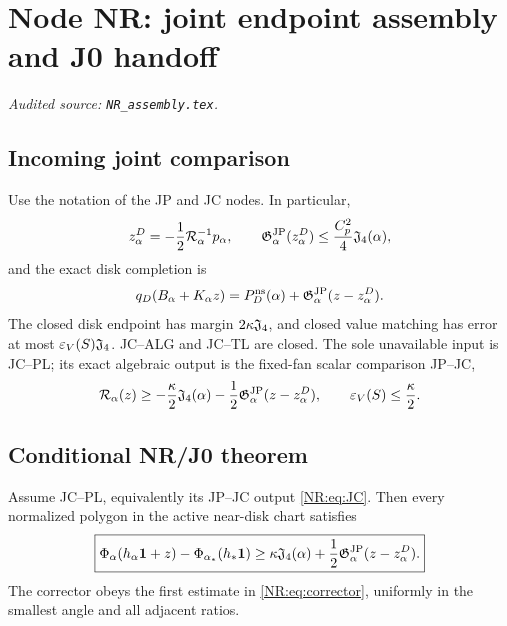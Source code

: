 \begingroup
\section{Node NR: joint endpoint assembly and J0 handoff}
\label{module:NR}
\noindent\textit{Audited source: \nolinkurl{NR_assembly.tex}.}
\subsection{Incoming joint comparison}

Use the notation of the JP and JC nodes.  In particular,
\begin{equation}\label{NR:eq:corrector}
 z_\alpha^D=-\frac12\mathcal R_\alpha^{-1}p_\alpha,
 \qquad
 \mathfrak G^{\rm JP}_\alpha(z_\alpha^D)
 \le\frac{C_p^2}{4}\mathfrak J_4(\alpha),
\end{equation}
and the exact disk completion is
\begin{equation}\label{NR:eq:disk-completion}
 q_D(B_\alpha+K_\alpha z)
 =P_D^{\rm ns}(\alpha)+\mathfrak G^{\rm JP}_\alpha(z-z_\alpha^D).
\end{equation}
The closed disk endpoint has margin $2\kappa\mathfrak J_4$, and closed value
matching has error at most $\varepsilon_V(S)\mathfrak J_4$.  JC--ALG and JC--TL
are closed.  The sole unavailable input is JC--PL; its exact algebraic
output is the fixed-fan scalar comparison JP--JC,
\begin{equation}\label{NR:eq:JC}
 \mathcal{R}_\alpha(z)
 \ge-\frac\kappa2\mathfrak J_4(\alpha)
      -\frac12\mathfrak G^{\rm JP}_\alpha(z-z_\alpha^D),
 \qquad \varepsilon_V(S)\le\frac\kappa2.
\end{equation}

\subsection{Conditional NR/J0 theorem}

\begin{theorem}[JP--JC implies J0]\label{NR:thm:NR}
Assume JC--PL, equivalently its JP--JC output \eqref{NR:eq:JC}.  Then every normalized polygon in
the active near-disk chart satisfies
\begin{equation}\label{NR:eq:J0}
\boxed{
 \Phi_\alpha(h_\alpha\mathbf1+z)
 -\Phi_{\alpha_*}(h_*\mathbf1)
 \ge\kappa\mathfrak J_4(\alpha)
      +\frac12\mathfrak G^{\rm JP}_\alpha(z-z_\alpha^D).}
\end{equation}
The corrector obeys the first estimate in \eqref{NR:eq:corrector}, uniformly
in the smallest angle and all adjacent ratios.
\end{theorem}

